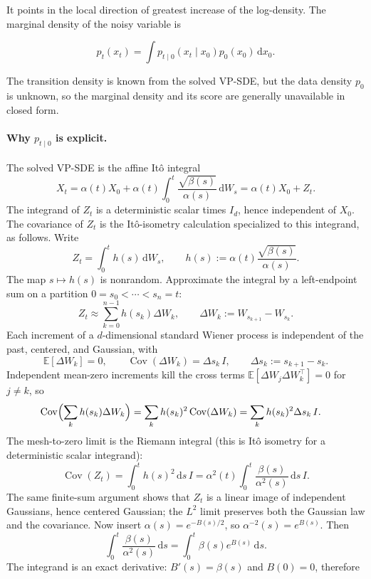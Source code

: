 \documentclass[11pt,a4paper]{article}
\theoremstyle{definition}
\begin{document}
It points in the local direction of greatest increase of the log-density. The marginal
density of the noisy variable is

\[
p_t(x_t)
=\int p_{t\mid 0}(x_t\mid x_0)p_0(x_0)\,\mathrm{d}x_0.
\]

The transition density is known from the solved VP-SDE, but the data density $p_0$ is
unknown, so the marginal density and its score are generally unavailable in closed form.

\paragraph*{Why $p_{t\mid 0}$ is explicit.}
The solved VP-SDE is the affine It\^o integral
\[
X_t
=
\alpha(t)X_0
+
\alpha(t)\int_0^t
\frac{\sqrt{\beta(s)}}{\alpha(s)}\,\mathrm{d}W_s
=
\alpha(t)X_0+Z_t.
\]
The integrand of $Z_t$ is a deterministic scalar times $I_d$, hence independent of $X_0$.
The covariance of $Z_t$ is the It\^o-isometry calculation specialized to this integrand,
as follows. Write
\[
Z_t
=
\int_0^t h(s)\,\mathrm{d}W_s,
\qquad
h(s)
:=
\alpha(t)\frac{\sqrt{\beta(s)}}{\alpha(s)}.
\]
The map $s\mapsto h(s)$ is nonrandom. Approximate the integral by a left-endpoint sum
on a partition $0=s_0<\cdots<s_n=t$:
\[
Z_t
\approx
\sum_{k=0}^{n-1}h(s_k)\Delta W_k,
\qquad
\Delta W_k:=W_{s_{k+1}}-W_{s_k}.
\]
Each increment of a $d$-dimensional standard Wiener process is independent of the past,
centered, and Gaussian, with
\[
\mathbb{E}[\Delta W_k]=0,
\qquad
\operatorname{Cov}(\Delta W_k)=\Delta s_k\,I,
\qquad
\Delta s_k:=s_{k+1}-s_k.
\]
Independent mean-zero increments kill the cross terms
$\mathbb{E}[\Delta W_j\Delta W_k^\top]=0$ for $j\neq k$, so
\[
\begin{aligned}
\operatorname{Cov}\Bigl(\sum_k h(s_k)\Delta W_k\Bigr)
&=
\sum_k h(s_k)^2\operatorname{Cov}(\Delta W_k)
=
\sum_k h(s_k)^2\Delta s_k\,I.
\end{aligned}
\]
The mesh-to-zero limit is the Riemann integral (this is It\^o isometry for a
deterministic scalar integrand):
\[
\operatorname{Cov}(Z_t)
=
\int_0^t h(s)^2\,\mathrm{d}s\,I
=
\alpha^2(t)\int_0^t\frac{\beta(s)}{\alpha^2(s)}\,\mathrm{d}s\,I.
\]
The same finite-sum argument shows that $Z_t$ is a linear image of independent Gaussians,
hence centered Gaussian; the $L^2$ limit preserves both the Gaussian law and the
covariance. Now insert $\alpha(s)=e^{-B(s)/2}$, so $\alpha^{-2}(s)=e^{B(s)}$. Then
\[
\int_0^t\frac{\beta(s)}{\alpha^2(s)}\,\mathrm{d}s
=
\int_0^t\beta(s)e^{B(s)}\,\mathrm{d}s.
\]
The integrand is an exact derivative: $B'(s)=\beta(s)$ and $B(0)=0$, therefore
\end{document}
